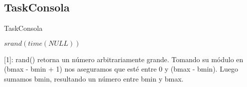 \subsection{TaskConsola}

\begin{algorithm}
 \caption{TaskConsola}
 \begin{algorithmic}[1]
   \State $srand(time(NULL))$ 
     \Comment{[1]}
   \EndFor
 \EndProcedure
 \end{algorithmic}
\end{algorithm}

[1]: rand() retorna un número arbitrariamente grande.
Tomando su módulo en (bmax - bmin + 1) nos aseguramos que esté entre 0 y (bmax - bmin).\newline
Luego sumamos bmin, resultando un número entre bmin y bmax.